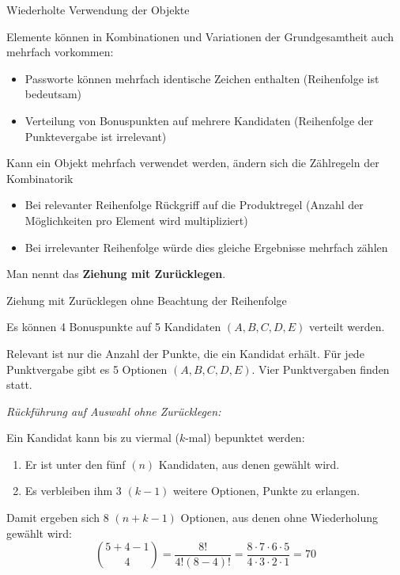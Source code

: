 \documentclass[12pt,ngerman,a4paper,ignorenonframetext,]{beamer}
\begin{document}
\begin{frame}{Wiederholte Verwendung der Objekte}
\protect\hypertarget{wiederholte-verwendung-der-objekte}{}

Elemente können in Kombinationen und Variationen der Grundgesamtheit
auch mehrfach vorkommen:

\begin{itemize}
        \item   Passworte können mehrfach identische Zeichen enthalten  
                (Reihenfolge ist bedeutsam)
        \item   Verteilung von Bonuspunkten auf mehrere Kandidaten  
                (Reihenfolge der Punktevergabe ist irrelevant)
\end{itemize}

Kann ein Objekt mehrfach verwendet werden, ändern sich die Zählregeln
der Kombinatorik

\begin{itemize}
        \item   Bei relevanter Reihenfolge Rückgriff auf die Produktregel  
                (Anzahl der Möglichkeiten pro Element wird multipliziert)
        \item   Bei irrelevanter Reihenfolge würde dies gleiche Ergebnisse
                mehrfach zählen
\end{itemize}

Man nennt das \textbf{Ziehung mit Zurücklegen}.

\end{frame}

\begin{frame}{Ziehung mit Zurücklegen ohne Beachtung der Reihenfolge}
\protect\hypertarget{ziehung-mit-zurucklegen-ohne-beachtung-der-reihenfolge}{}

Es können 4 Bonuspunkte auf 5 Kandidaten \((A, B, C, D, E)\) verteilt
werden.

Relevant ist nur die Anzahl der Punkte, die ein Kandidat erhält. Für
jede Punktvergabe gibt es 5 Optionen \((A, B, C, D, E)\). Vier
Punktvergaben finden statt.

\emph{Rückführung auf Auswahl ohne Zurücklegen:}

Ein Kandidat kann bis zu viermal (\(k\)-mal) bepunktet werden:

\begin{enumerate}[1.)]
        \item   Er ist unter den fünf $(n)$ Kandidaten, aus denen gewählt 
                wird.
        \item   Es verbleiben ihm $3$ $(k-1)$ weitere Optionen, Punkte zu 
                erlangen.
\end{enumerate}

Damit ergeben sich \(8\) \((n+k-1)\) Optionen, aus denen ohne
Wiederholung gewählt wird: \begin{equation*} 
    \binom{5+4-1}{4} = \frac{8!}{4!(8-4)!}
                     =\frac{8 \cdot 7 \cdot 6 \cdot 5}{4 \cdot 3 \cdot 2 \cdot 1} 
                     = 70 
\end{equation*}

\end{frame}
\end{document}

